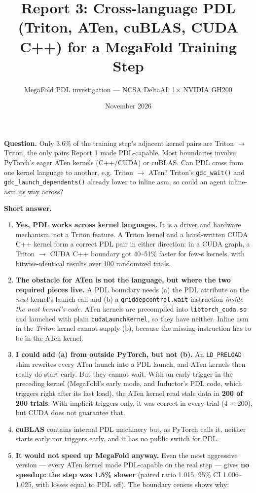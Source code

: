 \documentclass[10pt]{article}
\title{Report 3: Cross-language PDL (Triton, ATen, cuBLAS, CUDA C++) for a MegaFold Training Step}
\author{MegaFold PDL investigation --- NCSA DeltaAI, 1$\times$ NVIDIA GH200}
\date{November 2026}
\begin{document}
\maketitle

\textbf{Question.} Only 3.6\% of the training step's adjacent kernel pairs are Triton $\rightarrow$ Triton, the only pairs Report 1 made PDL-capable. Most boundaries involve PyTorch's eager ATen kernels (C++/CUDA) or cuBLAS. Can PDL cross from one kernel language to another, e.g. Triton $\rightarrow$ ATen? Triton's \texttt{gdc\_wait()} and \texttt{gdc\_launch\_dependents()} already lower to inline asm, so could an agent inline-asm its way across?


\textbf{Short answer.}


\begin{enumerate}
\item \textbf{Yes, PDL works across kernel languages.} It is a driver and hardware mechanism, not a Triton feature. A Triton kernel and a hand-written CUDA C++ kernel form a correct PDL pair in either direction: in a CUDA graph, a Triton $\rightarrow$ CUDA C++ boundary got 40--51\% faster for few-\textmu{}s kernels, with bitwise-identical results over 100 randomized trials.
\item \textbf{The obstacle for ATen is not the language, but where the two required pieces live.} A PDL boundary needs (a) the PDL attribute on the \emph{next} kernel's launch call and (b) a \texttt{griddepcontrol.wait} instruction \emph{inside the next kernel's code}. ATen kernels are precompiled into \texttt{libtorch\_cuda.so} and launched with plain \texttt{cudaLaunchKernel}, so they have neither. Inline asm in the \emph{Triton} kernel cannot supply (b), because the missing instruction has to be in the ATen kernel.
\item \textbf{I could add (a) from outside PyTorch, but not (b).} An \texttt{LD\_PRELOAD} shim rewrites every ATen launch into a PDL launch, and ATen kernels then really do start early. But they cannot wait. With an early trigger in the preceding kernel (MegaFold's early mode, and Inductor's PDL code, which triggers right after its last load), the ATen kernel read stale data in \textbf{200 of 200 trials}. With implicit triggers only, it was correct in every trial (4 $\times$ 200), but CUDA does not guarantee that.
\item \textbf{cuBLAS} contains internal PDL machinery but, as PyTorch calls it, neither starts early nor triggers early, and it has no public switch for PDL.
\item \textbf{It would not speed up MegaFold anyway.} Even the most aggressive version --- every ATen kernel made PDL-capable on the real step --- gives \textbf{no speedup: the step was 1.5\% slower} (paired ratio 1.015, 95\% CI 1.006--1.025, with losses equal to PDL off). The boundary census shows why:
\end{enumerate}
\end{document}

